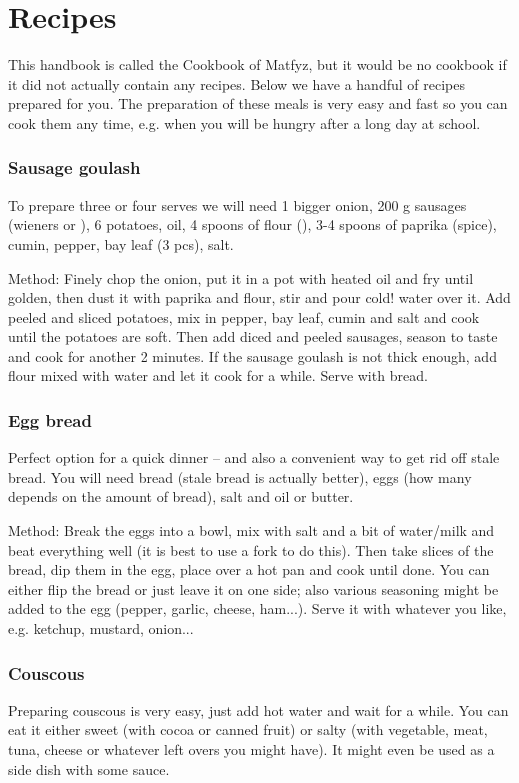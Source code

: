 \section{Recipes}
This handbook is called the Cookbook of Matfyz, but it would be no cookbook if
it did not actually contain any recipes. Below we have a handful of recipes
prepared for you.
The preparation of these meals is very easy and fast so you can cook them any
time, e.g. when you will be hungry after a long day at school.


\subsubsection*{Sausage goulash}
To prepare three or four serves we will need 1 bigger onion, 200 g sausages
(wieners or ), 6 potatoes, oil, 4 spoons of flour (),
3-4 spoons of paprika (spice), cumin, pepper, bay leaf (3 pcs), salt.

Method: Finely chop the onion, put it in a pot with heated oil and fry until
golden, then dust it with paprika and flour, stir and pour cold! water over it.
Add peeled and sliced potatoes, mix in pepper, bay leaf, cumin and salt and cook
until the potatoes are soft.
Then add diced and peeled sausages, season to taste and cook for another 2
minutes. If the sausage goulash is not thick enough, add flour mixed with water
and let it cook for a while. Serve with bread.


\subsubsection*{Egg bread}
Perfect option for a quick dinner -- and also a convenient way to get rid off
stale bread. You will need bread (stale bread is actually better), eggs (how
many depends on the amount of bread), salt and oil or butter.

Method: Break the eggs into a bowl, mix with salt and a bit of water/milk and
beat everything well (it is best to use a fork to do this).
Then take slices of the bread, dip them in the egg, place over a hot pan and
cook until done. You can either flip the bread or just leave it on one side;
also various seasoning might be added to the egg (pepper, garlic, cheese,
ham...).
Serve it with whatever you like, e.g. ketchup, mustard, onion...


\subsubsection*{Couscous}
Preparing couscous is very easy, just add hot water and wait for a while. You
can eat it either sweet (with cocoa or canned fruit) or salty (with vegetable,
meat, tuna, cheese or whatever left overs you might have). It might even be used
as a side dish with some sauce.


